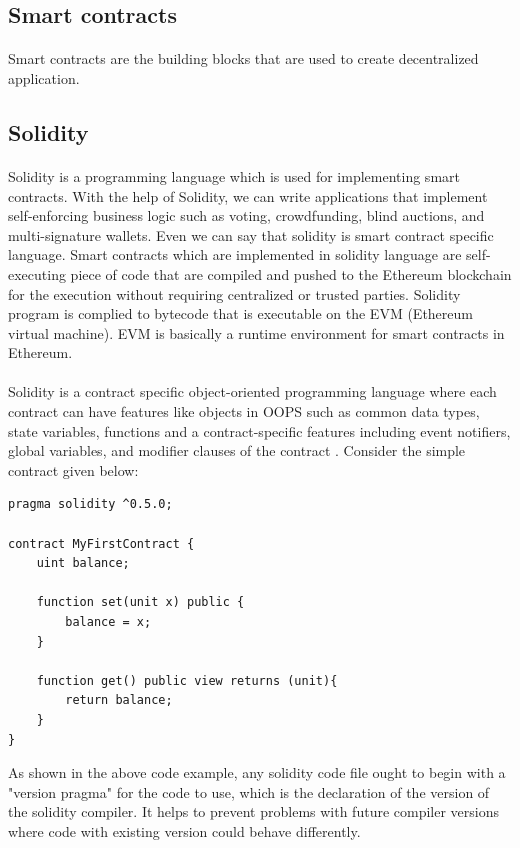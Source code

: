 \documentclass[11pt]{article}
\begin{document}
\subsection{Smart contracts}
\paragraph{}
Smart contracts are the building blocks that are used to create decentralized application.

\subsection{Solidity}
\paragraph{}
Solidity is a programming language which is used for implementing smart contracts. With the help of Solidity, we can write applications that implement self-enforcing business logic such as voting, crowdfunding, blind auctions, and multi-signature wallets. Even we can say that solidity is smart contract specific language\cite{Solidity82:online}. Smart contracts which are implemented in solidity language are self-executing piece of code that are compiled and pushed to the Ethereum blockchain for the execution without requiring centralized or trusted parties. Solidity program is complied to bytecode that is executable on the EVM (Ethereum virtual machine). EVM  is basically a runtime environment for smart contracts in Ethereum.
\paragraph{}
Solidity is a contract specific object-oriented programming language where each contract can have features like objects in OOPS such as common data types, state variables, functions and a contract-specific features including event notifiers, global variables, and modifier clauses of the contract \cite{Introduc89:online}. Consider the simple contract given below: \\
\begin{lstlisting}
pragma solidity ^0.5.0;

contract MyFirstContract {
    uint balance;
    
    function set(unit x) public {
        balance = x;
    }
    
    function get() public view returns (unit){
        return balance;
    }
}
\end{lstlisting}
As shown in the above code example, any solidity code file ought to begin with a "version pragma" for the code to use, which is the declaration of the version of the solidity compiler. It helps to prevent problems with future compiler versions where code with existing version could behave differently. \\
\end{document}
